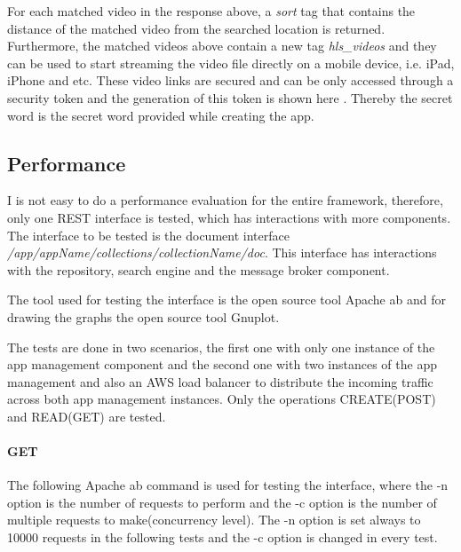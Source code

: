 For each matched video in the response above, a \textit{sort} tag that contains the distance of the matched video from the searched location is returned. Furthermore, the matched videos above contain a new tag \textit{hls\_videos} and they can be used to start streaming the video file directly on a mobile device, i.e. iPad, iPhone and etc. These video links are secured and can be only accessed through a security token and the generation of this token is shown here \cite{nginx:securelink}. Thereby the secret word is the secret word provided while creating the app.

\subsection{Performance\label{seq:eval_perf}}
I is not easy to do a performance evaluation for the entire framework, therefore, only one REST interface is tested, which has interactions with more components. The interface to be tested is the document interface \textit{/app/appName/collections/collectionName/doc}. This interface has interactions with the repository, search engine and the message broker component.%

The tool used for testing the interface is the open source tool Apache ab and for drawing the graphs the open source tool Gnuplot. 

The tests are done in two scenarios, the first one with only one instance of the app management component and the second one  with two instances of the app management and also an \ac{AWS} load balancer to distribute the incoming traffic across both app management instances. Only the operations CREATE(POST) and READ(GET) are tested.

\paragraph{GET}
The following Apache ab command is used for testing the interface, where the -n option is the number of requests to perform and the -c option is the number of multiple requests to make(concurrency level). The -n option is set always to 10000 requests in the following tests and the -c option is changed in every test.

